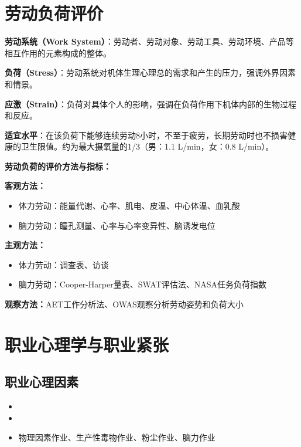 \section{劳动负荷评价}

\begin{defbox}
\textbf{劳动系统（Work System）}：劳动者、劳动对象、劳动工具、劳动环境、产品等相互作用的元素构成的整体。

\textbf{负荷（Stress）}：劳动系统对机体生理心理总的需求和产生的压力，强调外界因素和情景。

\textbf{应激（Strain）}：负荷对具体个人的影响，强调在负荷作用下机体内部的生物过程和反应。

\textbf{适宜水平}：在该负荷下能够连续劳动8小时，不至于疲劳，长期劳动时也不损害健康的卫生限值。约为最大摄氧量的1/3（男：1.1 L/min，女：0.8 L/min）。
\end{defbox}

\begin{tipbox}
\textbf{劳动负荷的评价方法与指标：}

\textbf{客观方法：}
\begin{itemize}[leftmargin=*]
    \item 体力劳动：能量代谢、心率、肌电、皮温、中心体温、血乳酸
    \item 脑力劳动：瞳孔测量、心率与心率变异性、脑诱发电位
\end{itemize}

\textbf{主观方法：}
\begin{itemize}[leftmargin=*]
    \item 体力劳动：调查表、访谈
    \item 脑力劳动：Cooper-Harper量表、SWAT评估法、NASA任务负荷指数
\end{itemize}

\textbf{观察方法：}AET工作分析法、OWAS观察分析劳动姿势和负荷大小
\end{tipbox}

\section{职业心理学与职业紧张}

\subsection{职业心理因素}

\begin{itemize}[leftmargin=*]
    \item {}
    \item {}
    \item 物理因素作业、生产性毒物作业、粉尘作业、脑力作业
\end{itemize}

